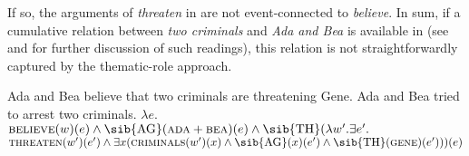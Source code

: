 \documentclass[output=paper]{langscibook}
\begin{document}
{%
} If so, the arguments of \textit{threaten} in  are not event-connected to \textit{believe}. In sum, if a cumulative relation between \textit{two criminals} and \textit{Ada and Bea} is available in  (see \citealt{Pasternak:2018} and \citealt{Schmitt:2020} for further discussion of such readings), this relation is not straightforwardly captured by the thematic-role approach.

\ea
\ea \label{has-sch:questi-dd}  Ada and Bea believe that two criminals are threatening Gene.
\ex  \label{has-sch:questi-aa} Ada and Bea tried to arrest two criminals.
\z\ex
\label{has-sch:believe-formula}$\lambda e.$\sib{*}$\textsc{believe}(w)(e) \land \text{\sib{AG}}(\textsc{ada}+\textsc{bea})(e) \land \text{\sib{TH}}(\lambda w'.\exists e'.$\sib{*}$\textsc{threaten}(w')(e') \land \exists x(\textsc{criminals}(w')(x) \land \text{\sib{AG}}(x)(e') \land \text{\sib{TH}}(\textsc{gene})(e')))(e)$
\z
\end{document}
